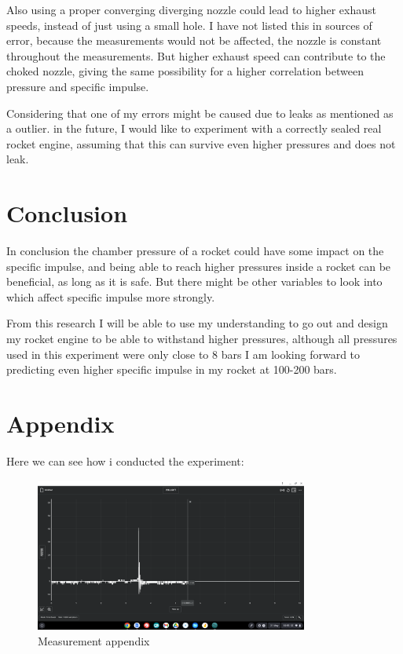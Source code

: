\documentclass[12pt,a4paper]{article}
\begin{document}
Also using a proper converging diverging nozzle could lead to higher exhaust speeds, instead of just using a small hole. I have not listed this in sources of error, because the measurements would not be affected, the nozzle is constant throughout the measurements. But higher exhaust speed can contribute to the choked nozzle, giving the same possibility for a higher correlation between pressure and specific impulse.

Considering that one of my errors might be caused due to leaks as mentioned as a outlier. in the future, I would like to experiment with a correctly sealed real rocket engine, assuming that this can survive even higher pressures and does not leak.

\section{Conclusion}

In conclusion the chamber pressure of a rocket could have some impact on the specific impulse, and being able to reach higher pressures inside a rocket can be beneficial, as long as it is safe. But there might be other variables to look into which affect specific impulse more strongly.

From this research I will be able to use my understanding to go out and design my rocket engine to be able to withstand higher pressures, although all pressures used in this experiment were only close to 8 bars I am looking forward to predicting even higher specific impulse in my rocket at 100-200 bars.

\section{Appendix}

Here we can see how i conducted the experiment:

\begin{figure}[H]
\centering
\includegraphics[width=0.8\textwidth]{measering apendix.png}
\caption{Measurement appendix}
\label{fig:measurement_appendix}
\end{figure}
\end{document}
